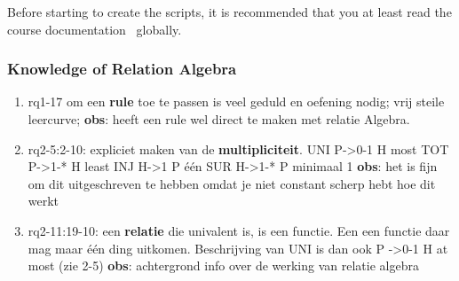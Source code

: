Before starting to create the scripts, it is recommended that you at least read the course documentation~ globally.



\subsubsection{Knowledge of Relation Algebra}
\begin{comment}
plaats hier de afgehandelde items.
\end{comment}

\begin{enumerate}
    \item rq1-17 om een \textbf{rule} toe te passen is veel geduld en oefening nodig; vrij steile leercurve; 
    \newline\textbf{obs}: heeft een rule wel direct te maken met relatie Algebra.

    \item rq2-5:2-10: expliciet maken van de \textbf{multipliciteit}.\newline
    UNI P->0-1 H  most\newline
    TOT P->1-* H  least\newline
    INJ H->1 P    één\newline
    SUR H->1-* P  minimaal 1
    \newline\textbf{obs}: het is fijn om dit uitgeschreven te hebben omdat je niet constant scherp hebt hoe dit werkt
    
    \item rq2-11:19-10: een \textbf{relatie} die univalent is, is een functie. Een een functie daar mag maar één ding uitkomen. Beschrijving van UNI is dan ook P ->0-1 H at most (zie 2-5)
    \newline\textbf{obs}: achtergrond info over de werking van relatie algebra
\end{enumerate}

